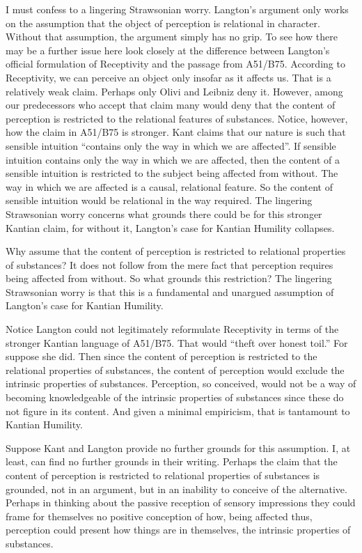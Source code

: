 I must confess to a lingering Strawsonian worry. Langton's argument only works on the assumption that the object of perception is relational in character. Without that assumption, the argument simply has no grip. To see how there may be a further issue here look closely at the difference between Langton's official formulation of Receptivity and the passage from A51/B75. According to Receptivity, we can perceive an object only insofar as it affects us. That is a relatively weak claim. Perhaps only Olivi and Leibniz deny it. However, among our predecessors who accept that claim many would deny that the content of perception is restricted to the relational features of substances. Notice, however, how the claim in A51/B75 is stronger. Kant claims that our nature is such that sensible intuition ``contains only the way in which we are affected''. If sensible intuition contains only the way in which we are affected, then the content of a sensible intuition is restricted to the subject being affected from without. The way in which we are affected is a causal, relational feature. So the content of sensible intuition would be relational in the way required. The lingering Strawsonian worry concerns what grounds there could be for this stronger Kantian claim, for without it, Langton's case for Kantian Humility collapses. 

Why assume that the content of perception is restricted to relational properties of substances? It does not follow from the mere fact that perception requires being affected from without. So what grounds this restriction? The lingering Strawsonian worry is that this is a fundamental and unargued assumption of Langton's case for Kantian Humility.

Notice Langton could not legitimately reformulate Receptivity in terms of the stronger Kantian language of A51/B75. That would ``theft over honest toil.'' For suppose she did. Then since the content of perception is restricted to the relational properties of substances, the content of perception would exclude the intrinsic properties of substances. Perception, so conceived, would not be a way of becoming knowledgeable of the intrinsic properties of substances since these do not figure in its content. And given a minimal empiricism, that is tantamount to Kantian Humility.

Suppose Kant and Langton provide no further grounds for this assumption. I, at least, can find no further grounds in their writing. Perhaps the claim that the content of perception is restricted to relational properties of substances is grounded, not in an argument, but in an inability to conceive of the alternative. Perhaps in thinking about the passive reception of sensory impressions they could frame for themselves no positive conception of how, being affected thus, perception could present how things are in themselves, the intrinsic properties of substances.

